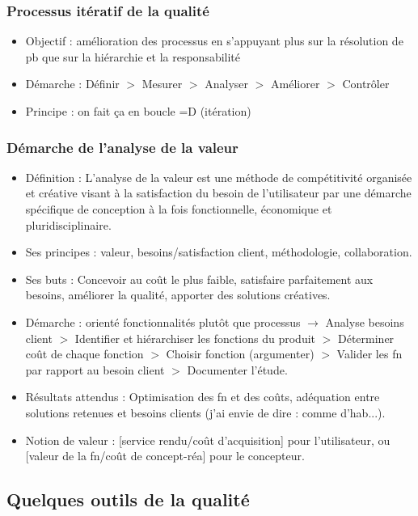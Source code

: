 			\subsubsection{Processus itératif de la qualité}
				\begin{itemize}
				\item Objectif : amélioration des processus en s'appuyant plus sur la résolution de pb que sur la hiérarchie et la responsabilité
				\item Démarche : Définir $>$ Mesurer $>$ Analyser $>$ Améliorer $>$ Contrôler
				\item Principe : on fait ça en boucle =D (itération)
				\end{itemize}
			\subsubsection{Démarche de l'analyse de la valeur}
				\begin{itemize}
				\item Définition : L'analyse de la valeur est une méthode de compétitivité organisée et créative visant à la satisfaction du besoin de l'utilisateur par une démarche spécifique de conception à la fois fonctionnelle, économique et pluridisciplinaire. 
				\item Ses principes : valeur, besoins/satisfaction client, méthodologie, collaboration. 
				\item Ses buts : Concevoir au coût le plus faible, satisfaire parfaitement aux besoins, améliorer la qualité, apporter des solutions créatives. 
				\item Démarche : orienté fonctionnalités plutôt que processus $\rightarrow$ Analyse besoins client $>$ Identifier et hiérarchiser les fonctions du produit $>$ Déterminer coût de chaque fonction $>$ Choisir fonction (argumenter) $>$ Valider les fn par rapport au besoin client $>$ Documenter l'étude. 
				\item Résultats attendus : Optimisation des fn et des coûts, adéquation entre solutions retenues et besoins clients (j'ai envie de dire : comme d'hab...). 
				\item Notion de valeur : [service rendu/coût d'acquisition] pour l'utilisateur, ou [valeur de la fn/coût de concept-réa] pour le concepteur. 
				\end{itemize}

		\subsection{Quelques outils de la qualité}
